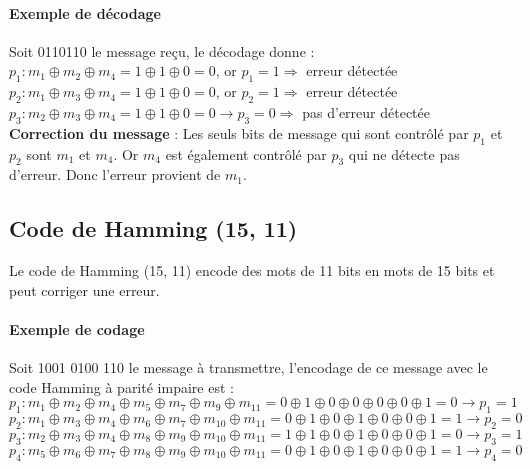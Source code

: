 \documentclass[a4paper, 12pt]{article}
\begin{document}
	\paragraph{Exemple de décodage}
	Soit 0110110 le message reçu, le décodage donne :\\
	$p_{1} : m_{1} \oplus m_{2} \oplus m_{4} = 1 \oplus 1 \oplus 0 = 0$, or $p_{1} = 1 \Longrightarrow$ erreur détectée \\
	$p_{2} : m_{1} \oplus m_{3} \oplus m_{4} = 1 \oplus 1 \oplus 0 = 0$, or $p_{2} = 1 \Longrightarrow$ erreur détectée \\
	$p_{3} : m_{2} \oplus m_{3} \oplus m_{4} = 1 \oplus 1 \oplus 0 = 0 \rightarrow p_{3} = 0 \Longrightarrow$ pas d’erreur détectée \\
	\textbf{Correction du message} : Les seuls bits de message qui sont contrôlé par $p_{1}$ et $p_{2}$ sont $m_{1}$ et $m_{4}$. Or $m_{4}$ est également contrôlé par $p_{3}$ qui ne détecte pas d’erreur. Donc l’erreur provient de $m_{1}$.

	\subsection{Code de Hamming (15, 11)}
	Le code de Hamming (15, 11) encode des mots de 11 bits en mots de 15 bits et peut corriger une erreur.
	\paragraph{Exemple de codage} Soit 1001 0100 110 le message à transmettre, l’encodage de ce message avec le code Hamming à parité impaire est : \\
	$p_{1} : m_{1} \oplus m_{2} \oplus m_{4} \oplus m_{5} \oplus m_{7} \oplus m_{9} \oplus m_{11} = 0 \oplus 1 \oplus 0 \oplus 0 \oplus 0 \oplus 0 \oplus 1 = 0 \rightarrow p_{1} = 1$ \\
	$p_{2} : m_{1} \oplus m_{3} \oplus m_{4} \oplus m_{6} \oplus m_{7} \oplus m_{10} \oplus m_{11} = 0 \oplus 1 \oplus 0 \oplus 1 \oplus 0 \oplus 0 \oplus 1 = 1 \rightarrow p_{2} = 0$ \\
	$p_{3} : m_{2} \oplus m_{3} \oplus m_{4} \oplus m_{8} \oplus m_{9} \oplus m_{10} \oplus m_{11} = 1 \oplus 1 \oplus 0 \oplus 1 \oplus 0 \oplus 0 \oplus 1 = 0 \rightarrow p_{3} = 1$ \\
	$p_{4} : m_{5} \oplus m_{6} \oplus m_{7} \oplus m_{8} \oplus m_{9} \oplus m_{10} \oplus m_{11} = 0 \oplus 1 \oplus 0 \oplus 1 \oplus 0 \oplus 0 \oplus 1 = 1 \rightarrow p_{4} = 0$
\end{document}
